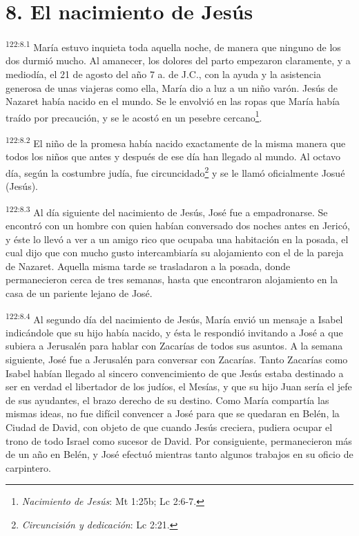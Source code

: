 \section*{8. El nacimiento de Jesús}
\par 
\textsuperscript{122:8.1} María estuvo inquieta toda aquella noche, de manera que ninguno de los dos durmió mucho. Al amanecer, los dolores del parto empezaron claramente, y a mediodía, el 21 de agosto del año 7 a. de J.C., con la ayuda y la asistencia generosa de unas viajeras como ella, María dio a luz a un niño varón. Jesús de Nazaret había nacido en el mundo. Se le envolvió en las ropas que María había traído por precaución, y se le acostó en un pesebre cercano\footnote{\textit{Nacimiento de Jesús}: Mt 1:25b; Lc 2:6-7.}.

\par 
\textsuperscript{122:8.2} El niño de la promesa había nacido exactamente de la misma manera que todos los niños que antes y después de ese día han llegado al mundo. Al octavo día, según la costumbre judía, fue circuncidado\footnote{\textit{Circuncisión y dedicación}: Lc 2:21.} y se le llamó oficialmente Josué (Jesús).

\par 
\textsuperscript{122:8.3} Al día siguiente del nacimiento de Jesús, José fue a empadronarse. Se encontró con un hombre con quien habían conversado dos noches antes en Jericó, y éste lo llevó a ver a un amigo rico que ocupaba una habitación en la posada, el cual dijo que con mucho gusto intercambiaría su alojamiento con el de la pareja de Nazaret. Aquella misma tarde se trasladaron a la posada, donde permanecieron cerca de tres semanas, hasta que encontraron alojamiento en la casa de un pariente lejano de José.

\par 
\textsuperscript{122:8.4} Al segundo día del nacimiento de Jesús, María envió un mensaje a Isabel indicándole que su hijo había nacido, y ésta le respondió invitando a José a que subiera a Jerusalén para hablar con Zacarías de todos sus asuntos. A la semana siguiente, José fue a Jerusalén para conversar con Zacarías. Tanto Zacarías como Isabel habían llegado al sincero convencimiento de que Jesús estaba destinado a ser en verdad el libertador de los judíos, el Mesías, y que su hijo Juan sería el jefe de sus ayudantes, el brazo derecho de su destino. Como María compartía las mismas ideas, no fue difícil convencer a José para que se quedaran en Belén, la Ciudad de David, con objeto de que cuando Jesús creciera, pudiera ocupar el trono de todo Israel como sucesor de David. Por consiguiente, permanecieron más de un año en Belén, y José efectuó mientras tanto algunos trabajos en su oficio de carpintero.

